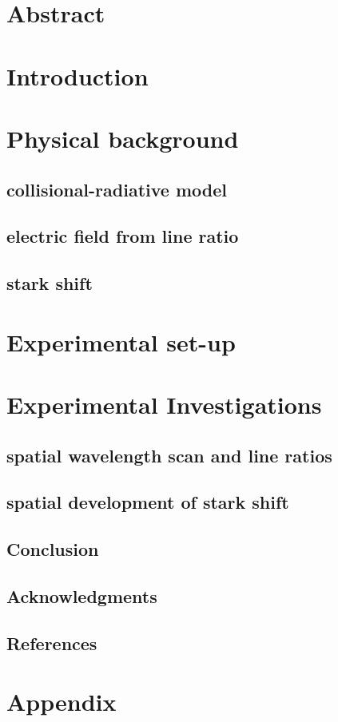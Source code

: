 \documentclass[a4paper,10pt,twocolumn,twoside]{article}
\begin{document}
	\tableofcontents
	\vfill
	\clearpage
	\twocolumn

	\section{Abstract}

	\section{Introduction}


	\section{Physical background}
	
		\subsection{collisional-radiative model}
		
		\subsection{electric field from line ratio}
		
		\subsection{stark shift}

		
	\section{Experimental set-up}


	\section{Experimental Investigations}
	
		\subsection{spatial wavelength scan and line ratios}
		
		\subsection{spatial development of stark shift}

		\subsection{Conclusion}
		
		\subsection{Acknowledgments}
		

		\subsection{References}

			
			


	\section{Appendix}
\end{document}
